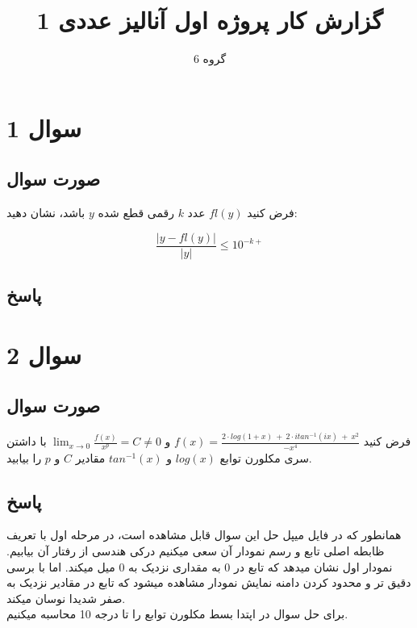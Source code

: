 \documentclass[12pt, letterpaper]{article}
\title{گزارش کار پروژه اول آنالیز عددی 1}
\author{گروه 6}
\begin{document}
\maketitle

\section{سوال 1}
\subsection{صورت سوال}
فرض کنید \(fl(y)\) عدد \(k\) رقمی قطع شده \(y\) باشد، نشان دهید:

\[\frac{\big| y-fl(y) \big| }{\big| y \big|} \le 10^{-k+}\]

\subsection{پاسخ}



\vspace{5mm}

\section{سوال 2}
\subsection{صورت سوال}
فرض کنید
\(f(x) = \frac{2 \cdot log(1+x) \: + \: 2 \cdot i tan^{-1}(ix) \: + \: x^2}{-x^4}\)
و 
\(\lim_{x\to 0}\frac{f(x)}{x^p} = C \ne 0\)
با داشتن سری مکلورن توابع 
\(log(x)\)
و 
\(tan^{-1}(x)\)
مقادیر 
\(C\)
و 
\(p\)
را بیابید.

\subsection{پاسخ}
همانطور که در فایل میپل حل این سوال قابل مشاهده است، در مرحله اول با تعریف ظابطه اصلی تابع و رسم نمودار آن سعی میکنیم درکی هندسی از رفتار آن بیابیم. نمودار اول نشان میدهد که تابع در 0 به مقداری نزدیک به 0 میل میکند. اما با برسی دقیق تر و محدود کردن دامنه نمایش نمودار مشاهده میشود که تابع در مقادیر نزدیک به صفر شدیدا نوسان میکند. \\
برای حل سوال در اپتدا بسط مکلورن توابع را تا درجه 10 محاسبه میکنیم.
\end{document}
